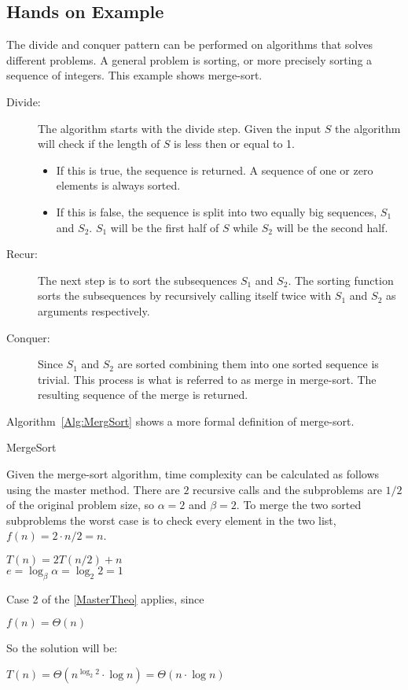 \subsection{Hands on Example}
The divide and conquer pattern can be performed on algorithms that solves
different problems. A general problem is sorting, or more precisely sorting a
sequence of integers. This example shows merge-sort.

\begin{description}
\item[Divide:] The algorithm starts with the divide step. Given the input $S$
the algorithm will check if the length of $S$ is less then or equal to 1.
\begin{itemize}
\item If this is true, the sequence is returned. A sequence of one or zero
elements is always sorted.
\item If this is false, the sequence is split into two equally big sequences,
$S_1$ and $S_2$. $S_1$ will be the first half of $S$ while $S_2$ will be the
second half.
\end{itemize}
\item[Recur:] The next step is to sort the subsequences $S_1$ and $S_2$. The
sorting function sorts the subsequences by recursively calling itself twice with
$S_1$ and $S_2$ as arguments respectively.
\item[Conquer:] Since $S_1$ and $S_2$ are sorted combining them into one sorted
sequence is trivial. This process is what is referred to as merge in merge-sort.
The resulting sequence of the merge is returned.
\end{description}
Algorithm~\ref{Alg:MergSort} shows a more formal definition of merge-sort.

\begin{algorithm}
\DontPrintSemicolon
{}
\caption{MergeSort}
\label{Alg:MergSort}
\end{algorithm}

Given the merge-sort algorithm, time complexity can be calculated as follows
using the master method. There are $2$ recursive calls and the subproblems are
$1/2$ of the original problem size, so $\alpha=2$ and $\beta=2$. To merge the
two sorted subproblems the worst case is to check every element in the two list,
$f(n) = 2 \cdot n/2 = n$.
\begin{center}
$T(n) = 2T(n/2) + n$\\
$e=\log_\beta\alpha=\log_2 2=1$
\end{center}
Case 2 of the \cref{MasterTheo} applies, since
\begin{center}
$f(n) = \Theta(n)$
\end{center}
So the solution will be:
\begin{center}
$T(n) = \Theta(n^{\log_2 2} \cdot \log n) = \Theta(n \cdot \log n)$
\end{center}

